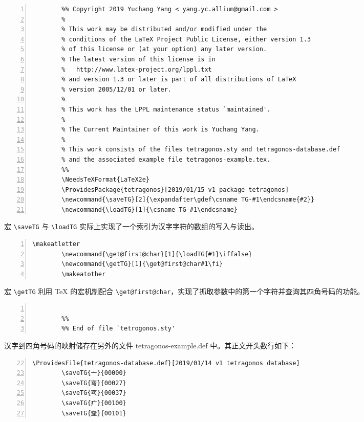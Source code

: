 \documentclass[a4paper]{ctexart}
\begin{document}
\begingroup
	\begin{adjustwidth}{3em}{3em}
	\footnotesize
	\begin{Verbatim}[numbers=left,numbersep=1ex,gobble=2,formatcom=\color{darkmiku}]
		%% tetragonos.sty
		%% Copyright 2019 Yuchang Yang < yang.yc.allium@gmail.com >
		%
		% This work may be distributed and/or modified under the
		% conditions of the LaTeX Project Public License, either version 1.3
		% of this license or (at your option) any later version.
		% The latest version of this license is in
		%   http://www.latex-project.org/lppl.txt
		% and version 1.3 or later is part of all distributions of LaTeX
		% version 2005/12/01 or later.
		%
		% This work has the LPPL maintenance status `maintained'.
		% 
		% The Current Maintainer of this work is Yuchang Yang.
		%
		% This work consists of the files tetragonos.sty and tetragonos-database.def
		% and the associated example file tetragonos-example.tex.
		%%
		\NeedsTeXFormat{LaTeX2e}
		\ProvidesPackage{tetragonos}[2019/01/15 v1 package tetragonos]
		\newcommand{\saveTG}[2]{\expandafter\gdef\csname TG-#1\endcsname{#2}}
		\newcommand{\loadTG}[1]{\csname TG-#1\endcsname}
	\end{Verbatim}
	宏 \verb|\saveTG| 与 \verb|\loadTG| 实际上实现了一个索引为汉字字符的数组的写入与读出。
	\begin{Verbatim}[numbers=left,numbersep=1ex,gobble=2,firstnumber=last,formatcom=\color{darkmiku}]
		\makeatletter
		\newcommand{\get@first@char}[1]{\loadTG{#1}\iffalse}
		\newcommand{\getTG}[1]{\get@first@char#1\fi}
		\makeatother
	\end{Verbatim}
	宏 \verb|\getTG| 利用 \TeX{} 的宏机制配合 \verb|\get@first@char|，实现了抓取参数中的第一个字符并查询其四角号码的功能。
	\begin{Verbatim}[numbers=left,numbersep=1ex,gobble=2,firstnumber=last,formatcom=\color{darkmiku}]
		
		%%
		%% End of file `tetrogonos.sty'
	\end{Verbatim}
	\end{adjustwidth}
\endgroup

汉字到四角号码的映射储存在另外的文件 tetragonos-example.def 中。其正文开头数行如下：

\begingroup
	\begin{adjustwidth}{3em}{3em}
	\footnotesize
	\begin{Verbatim}[numbers=left,numbersep=1ex,gobble=2,formatcom=\color{darkmiku},firstnumber=22]
		\ProvidesFile{tetragonos-database.def}[2019/01/14 v1 tetragonos database]
		\saveTG{亠}{00000}
		\saveTG{弯}{00027}
		\saveTG{亪}{00037}
		\saveTG{疒}{00100}
		\saveTG{韲}{00101}
	\end{Verbatim}
	\end{adjustwidth}
\endgroup
\end{document}
